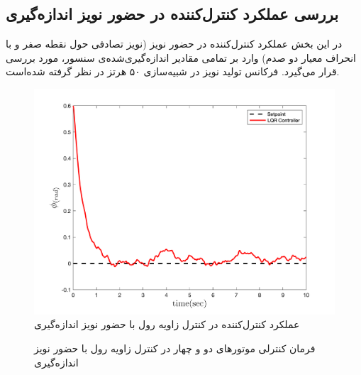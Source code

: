 \subsection{بررسی عملكرد کنترل‌کننده در حضور نويز اندازه‌گیری}\label{roll_noise}

در این بخش عملکرد کنترل‌کننده در حضور نویز (نویز تصادفی حول نقطه صفر و با انحراف معیار دو صدم) وارد بر تمامی مقادیر  اندازه‌گیری‌شده‌ی سنسور، مورد بررسی قرار می‌گیرد. فرکانس تولید نویز در شبیه‌سازی ۵۰ هرتز در نظر گرفته شده‌است.
\begin{figure}[H]
	\includegraphics[width=.48\linewidth]{../Figures/MIL/LQR/Roll/lqr_roll.png}
	\centering
	\caption{عملكرد کنترل‌کننده   در کنترل زاويه رول با حضور نويز اندازه‌گیری}
	\label{lqr_roll_figure_simulation_n}
\end{figure}
\begin{figure}[H]
	\centering
	\caption{‫‪فرمان کنترلی موتورهای دو و چهار در کنترل زاویه رول با حضور نويز اندازه‌گیری}
\end{figure}


